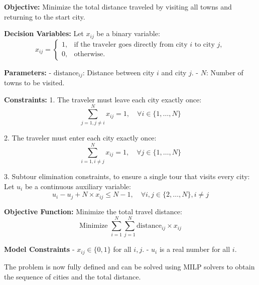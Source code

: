 \documentclass{article}
\begin{document}
\textbf{Objective:} Minimize the total distance traveled by visiting all towns and returning to the start city.

\textbf{Decision Variables:}
Let \( x_{ij} \) be a binary variable:
\[
x_{ij} = 
\begin{cases} 
1, & \text{if the traveler goes directly from city } i \text{ to city } j, \\
0, & \text{otherwise.}
\end{cases}
\]

\textbf{Parameters:}
- \( \text{distance}_{ij} \): Distance between city \( i \) and city \( j \).
- \( N \): Number of towns to be visited.

\textbf{Constraints:}
1. The traveler must leave each city exactly once:
   \[
   \sum_{j=1, j \neq i}^{N} x_{ij} = 1, \quad \forall i \in \{1, \ldots, N\}
   \]
   
2. The traveler must enter each city exactly once:
   \[
   \sum_{i=1, i \neq j}^{N} x_{ij} = 1, \quad \forall j \in \{1, \ldots, N\}
   \]

3. Subtour elimination constraints, to ensure a single tour that visits every city:
   Let \( u_i \) be a continuous auxiliary variable:
   \[
   u_i - u_j + N \times x_{ij} \leq N-1, \quad \forall i, j \in \{2, \ldots, N\}, i \neq j
   \]

\textbf{Objective Function:}
Minimize the total travel distance:
\[
\text{Minimize } \sum_{i=1}^{N} \sum_{j=1}^{N} \text{distance}_{ij} \times x_{ij}
\]

\textbf{Model Constraints}
- \( x_{ij} \in \{0, 1\} \) for all \( i, j \).
- \( u_i \) is a real number for all \( i \).

The problem is now fully defined and can be solved using MILP solvers to obtain the sequence of cities and the total distance.
\end{document}
